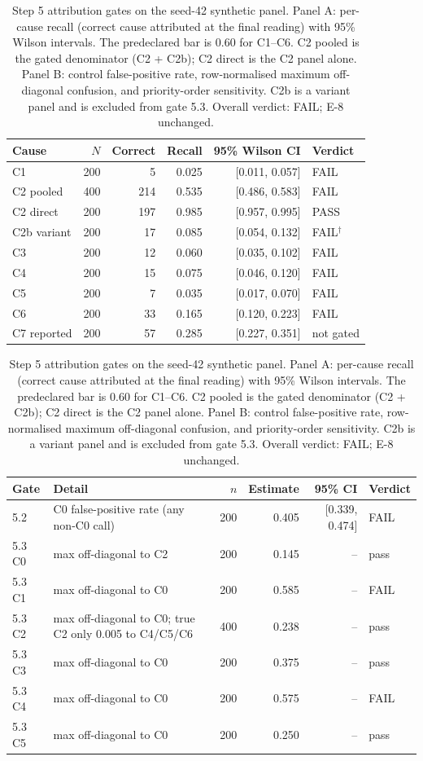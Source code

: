 \begin{table}[t]
\centering
\caption{Step 5 attribution gates on the seed-42 synthetic panel. Panel A: per-cause recall (correct cause attributed at the final reading) with 95\% Wilson intervals. The predeclared bar is 0.60 for C1--C6. C2 pooled is the gated denominator (C2 + C2b); C2 direct is the C2 panel alone. Panel B: control false-positive rate, row-normalised maximum off-diagonal confusion, and priority-order sensitivity. C2b is a variant panel and is excluded from gate 5.3. Overall verdict: FAIL; E-8 unchanged.}
\label{tab:step5-gates}
\small
\begin{tabular}{lrrrrl}
\toprule
Cause & $N$ & Correct & Recall & 95\% Wilson CI & Verdict \\
\midrule
C1 & 200 & 5 & 0.025 & [0.011, 0.057] & FAIL \\
C2 pooled & 400 & 214 & 0.535 & [0.486, 0.583] & FAIL \\
C2 direct & 200 & 197 & 0.985 & [0.957, 0.995] & PASS \\
C2b variant & 200 & 17 & 0.085 & [0.054, 0.132] & FAIL$^\dagger$ \\
C3 & 200 & 12 & 0.060 & [0.035, 0.102] & FAIL \\
C4 & 200 & 15 & 0.075 & [0.046, 0.120] & FAIL \\
C5 & 200 & 7 & 0.035 & [0.017, 0.070] & FAIL \\
C6 & 200 & 33 & 0.165 & [0.120, 0.223] & FAIL \\
C7 reported & 200 & 57 & 0.285 & [0.227, 0.351] & not gated \\
\bottomrule
\end{tabular}
\par\smallskip
\begin{tabular}{llrrrl}
\toprule
Gate & Detail & $n$ & Estimate & 95\% CI & Verdict \\
\midrule
5.2 & C0 false-positive rate (any non-C0 call) & 200 & 0.405 & [0.339, 0.474] & FAIL \\
5.3 C0 & max off-diagonal to C2 & 200 & 0.145 & -- & pass \\
5.3 C1 & max off-diagonal to C0 & 200 & 0.585 & -- & FAIL \\
5.3 C2 & max off-diagonal to C0; true C2 only 0.005 to C4/C5/C6 & 400 & 0.238 & -- & pass \\
5.3 C3 & max off-diagonal to C0 & 200 & 0.375 & -- & pass \\
5.3 C4 & max off-diagonal to C0 & 200 & 0.575 & -- & FAIL \\
5.3 C5 & max off-diagonal to C0 & 200 & 0.250 & -- & pass \\

\end{tabular}
\end{table}
